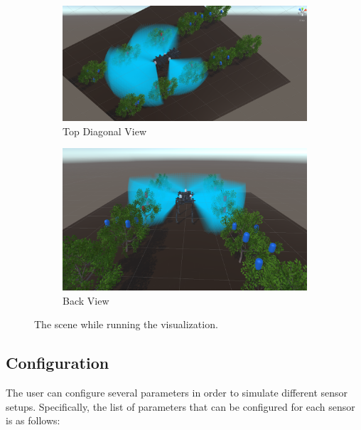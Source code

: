 \documentclass{article}
\begin{document}
\begin{figure}
\centering
\begin{subfigure}[b]{1\textwidth}
   \includegraphics[width=1\linewidth]{FOV(3).png}
   \caption{Top Diagonal View}
\end{subfigure}

\begin{subfigure}[b]{1\textwidth}
   \includegraphics[width=1\linewidth]{FOV(4).png}
   \caption{Back View}
\end{subfigure}
\caption[]{The scene while running the visualization.}
\end{figure}
\clearpage

\subsection{Configuration}

The user can configure several parameters in order to simulate different sensor setups. Specifically, the list of parameters that can be configured for each sensor is as follows:
\end{document}
